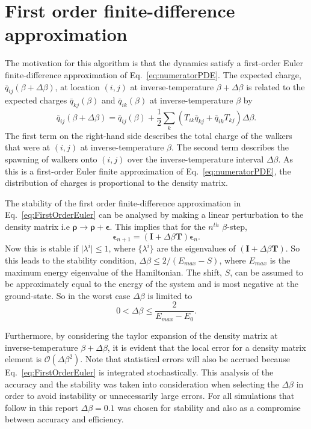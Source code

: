 \section{First order finite-difference approximation}

The motivation for this algorithm is that the dynamics satisfy a first-order Euler finite-difference approximation of Eq.~\ref{eq:numeratorPDE}. The expected charge, $\bar{q}_{ij}\left(\beta+\Delta\beta\right)$, at location $(i,j)$ at inverse-temperature $\beta + \Delta\beta$ is related to the expected charges $\bar{q}_{kj}\left(\beta\right)$ and  $\bar{q}_{ik}\left(\beta\right)$ at inverse-temperature $\beta$ by
\begin{equation}
\bar{q}_{ij}\left(\beta+\Delta\beta\right) = \bar{q}_{ij}\left(\beta\right)+\frac{1}{2}\sum_{k}\left(T_{ik}\bar{q}_{kj}+\bar{q}_{ik}T_{kj}\right)\Delta\beta.
\label{eq:FirstOrderEuler}
\end{equation}
The first term on the right-hand side describes the total charge of the walkers that were at $(i,j)$ at inverse-temperature $\beta$. The second term describes the spawning of walkers onto $(i,j)$ over the inverse-temperature interval $\Delta\beta$. As this is a first-order Euler finite approximation of Eq.~\ref{eq:numeratorPDE}, the distribution of charges is proportional to the density matrix. 

The stability\cite{Contaldi2011} of the first order finite-difference approximation in Eq.~\ref{eq:FirstOrderEuler} can be analysed by making a linear perturbation to the density matrix i.e $\bm{\rho} \to \bm{\rho} + \bm{\epsilon}$. This implies that for the $n^{th}$ $\beta$-step,
\begin{equation}
\bm{\epsilon}_{n+1} = (\bm{I}+\Delta\beta \bm{T}) \bm{\epsilon}_n.
\end{equation}
Now this is stable if $\lvert \lambda^i \rvert \le 1$, where $\{\lambda^i\}$ are the eigenvalues of $(\bm{I}+\Delta\beta \bm{T})$. So this leads to the stability condition, $\Delta \beta \le 2/(E_{max}-S)$, where $E_{max}$ is the maximum energy eigenvalue of the Hamiltonian. The shift, $S$, can be assumed to be approximately equal to the energy of the system and is most negative at the ground-state. So in the worst case $\Delta\beta$ is limited to
\begin{equation}
0 < \Delta \beta \le \frac{2}{E_{max}-E_0}.
\end{equation}

Furthermore, by considering the taylor expansion of the density matrix at inverse-temperature $\beta + \Delta\beta$, it is evident that the local error for a density matrix element is $\mathcal{O}(\Delta\beta^2)$. Note that statistical errors will also be accrued because Eq.~\ref{eq:FirstOrderEuler} is integrated stochastically. This analysis of the accuracy and the stability was taken into consideration when selecting the $\Delta\beta$ in order to avoid instability or unnecessarily large errors. For all simulations that follow in this report $\Delta\beta = 0.1$ was chosen for stability and also as a compromise between accuracy and efficiency.

